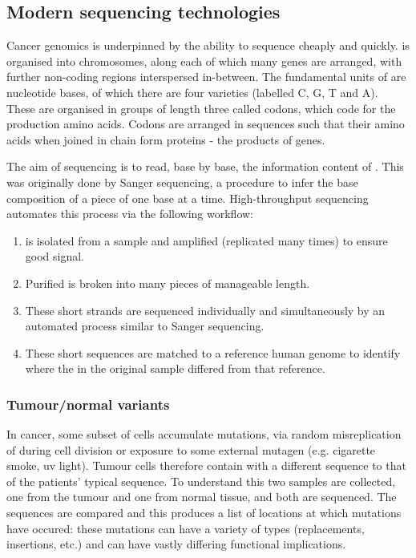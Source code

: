 \documentclass[thesis.tex]{subfiles}
\begin{document}
\subsection{Modern sequencing technologies}
Cancer genomics is underpinned by the ability to sequence  cheaply and quickly.  is organised into chromosomes, along each of which many genes are arranged, with further non-coding regions interspersed in-between. The fundamental units of  are nucleotide bases, of which there are four varieties (labelled C, G, T and A). These are organised in groups of length three called codons, which code for the production amino acids. Codons are arranged in sequences such that their amino acids when joined in chain form proteins - the products of genes. 

The aim of sequencing is to read, base by base, the information content of . This was originally done by Sanger sequencing, a procedure to infer the base composition of a piece of  one base at a time. High-throughput sequencing automates this process via the following workflow:
\begin{enumerate}
    \item {} is isolated from a sample and amplified (replicated many times) to ensure good signal.
    \item Purified  is broken into many pieces of manageable length.
    \item These short strands are sequenced individually and simultaneously by an automated process similar to Sanger sequencing.
    \item These short sequences are matched to a reference human genome to identify where the  in the original sample differed from that reference.
\end{enumerate}

\subsubsection{Tumour/normal variants}
In cancer, some subset of cells accumulate mutations, via random misreplication of  during cell division or exposure to some external mutagen (e.g. cigarette smoke, \gls{uv} light). Tumour cells therefore contain  with a different sequence to that of the patients' typical sequence. To understand this two samples are collected, one from the tumour and one from normal tissue, and both are sequenced. The sequences are compared and this produces a list of locations at which mutations have occured: these mutations can have a variety of types (replacements, insertions, etc.) and can have vastly differing functional implications.
\end{document}
